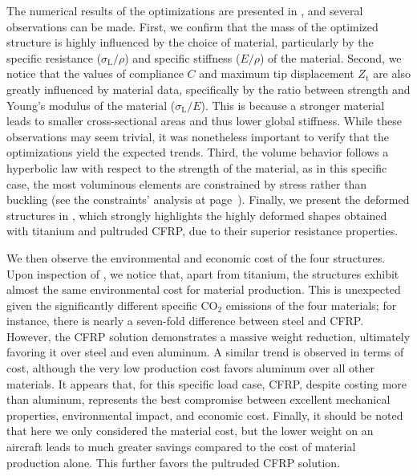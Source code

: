 The numerical results of the optimizations are presented in , and several observations can be made. First, we confirm that the mass of the optimized structure is highly influenced by the choice of material, particularly by the specific resistance ($\sigma_\text{L}/\rho$) and specific stiffness ($E/\rho$) of the material. Second, we notice that the values of compliance $C$ and maximum tip displacement $Z_\text{t}$ are also greatly influenced by material data, specifically by the ratio between strength and Young's modulus of the material ($\sigma_\text{L}/E$). This is because a stronger material leads to smaller cross-sectional areas and thus lower global stiffness. While these observations may seem trivial, it was nonetheless important to verify that the optimizations yield the expected trends. Third, the volume behavior follows a hyperbolic law with respect to the strength of the material, as in this specific case, the most voluminous elements are constrained by stress rather than buckling (see the constraints' analysis at page~\pageref{sec:07_amc}). Finally, we present the deformed structures in , which strongly highlights the highly deformed shapes obtained with titanium and pultruded CFRP, due to their superior resistance properties. 

We then observe the environmental and economic cost of the four structures. Upon inspection of , we notice that, apart from titanium, the structures exhibit almost the same environmental cost for material production. This is unexpected given the significantly different specific CO$_2$ emissions of the four materials; for instance, there is nearly a seven-fold difference between steel and CFRP. However, the CFRP solution demonstrates a massive weight reduction, ultimately favoring it over steel and even aluminum. A similar trend is observed in terms of cost, although the very low production cost favors aluminum over all other materials. It appears that, for this specific load case, CFRP, despite costing more than aluminum, represents the best compromise between excellent mechanical properties, environmental impact, and economic cost. Finally, it should be noted that here we only considered the material cost, but the lower weight on an aircraft leads to much greater savings compared to the cost of material production alone. This further favors the pultruded CFRP solution.

